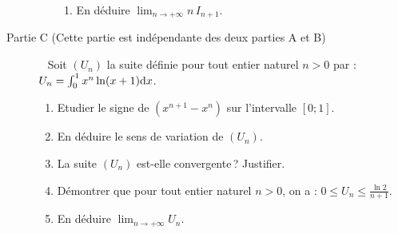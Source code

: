 \begin{description}
\begin{enumerate}
\begin{enumerate}
                                    \item En d\'eduire $\displaystyle{\lim_{n\rightarrow +\infty} n\,I_{n+1}}$.
                              \end{enumerate}
                  \end{enumerate}
            \item[Partie C (Cette partie est ind\'ependante des deux parties A et B)] ~\newline
                  Soit $(U_n)$ la suite d\'efinie pour tout entier naturel $n>0$ par : 
                  $U_n = \int_{0}^{1} x^n \ln (x+1) \mathrm{d}x$.
                  \begin{enumerate}
                        \item Etudier le signe de $(x^{n+1} - x^n)$ sur l'intervalle $[0;1]$.
                        \item En d\'eduire le sens de variation de $(U_n)$.
                        \item La suite $(U_n)$ est-elle convergente\,? Justifier.
                        \item D\'emontrer que pour tout entier naturel $n>0$, on a : 
                              $ 0 \leq U_n \leq \frac{\ln 2}{n+1} $.
                        \item En d\'eduire $\displaystyle{\lim_{n\rightarrow+\infty} U_n}$.
                  \end{enumerate}
      \end{description}































